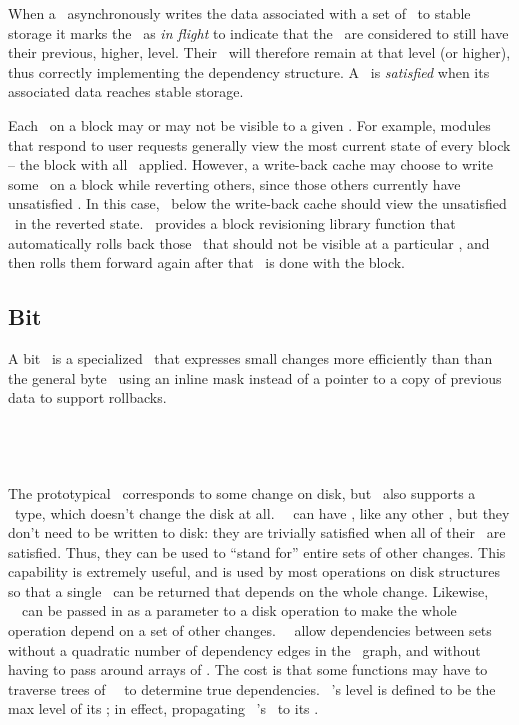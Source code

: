 When a \module\ asynchronously writes the data associated with a set of
\chdescs\ to stable storage it marks the \chdescs\ as \emph{in flight} to
indicate that the \chdescs\ are considered to still have their previous,
higher, level. Their \afters\ will therefore remain at that level (or higher),
thus correctly implementing the dependency structure. A \chdesc\ is
\emph{satisfied} when its associated data reaches stable storage.

Each \chdesc\ on a block may or may not be visible to a given \module.
%
For example, modules that respond to user requests generally view the most
current state of every block -- the block with all \chdescs\ applied.
%
However, a write-back cache may choose to write some \chdescs\ on a block
while reverting others, since those others currently have unsatisfied
\befores.
%
In this case, \modules\ below the write-back cache should view the
unsatisfied \chdescs\ in the reverted state.
%
\Kudos\ provides a block revisioning library function that automatically
rolls back those \chdescs\ that should not be visible at a particular \module,
and then rolls them forward again after that \module\ is done with the block.

\subsection{Bit \ChDescs}
\label{sec:chdescs:bit}
A bit \chdesc\ is a specialized \chdesc\ that expresses small changes
more efficiently than than the general byte \chdesc\, using an inline
mask instead of a pointer to a copy of previous data to support rollbacks.

\subsection{\Noop\ \ChDescs}
\label{sec:chdescs:noop}
The prototypical \chdesc\ corresponds to some change on disk, but \Kudos\
also supports a \emph{\noop} \chdesc\ type, which doesn't change the disk
at all. \Noop\ \chdescs\ can have \befores, like any other
\chdesc, but they don't need to be written to disk:  they are trivially
satisfied when all of their \befores\ are satisfied.
%
Thus, they can be used to ``stand for'' entire sets of other changes.
%
This capability is extremely useful, and is used by most operations on disk
structures so that a single \chdesc\ can be returned that depends on the whole
change. Likewise, \anoop\ \chdesc\ can be passed in as a parameter to a disk
operation to make the whole operation depend on a set of other changes. \Noop\
\chdescs\ allow dependencies between sets without a quadratic number
of dependency edges in the \chdesc\ graph, and without having to pass around
arrays of \chdescs.
%
The cost is that some functions may have to traverse trees of \noop\ \chdescs\
to determine true dependencies.
%
\Anoop\ \chdesc's level is defined to be the max level of its \befores;
in effect, propagating \anoop\ \chdesc's \befores\ to its \afters.

